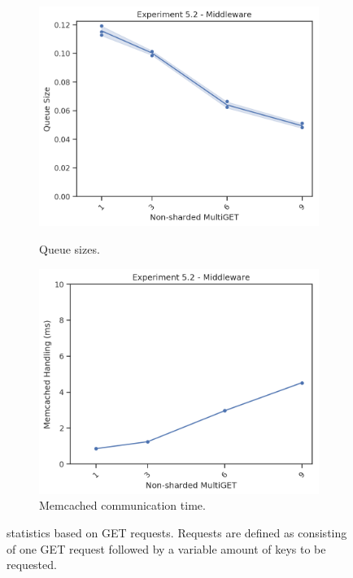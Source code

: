 \begin{figure}
            \begin{subfigure}[t!]{0.48\textwidth}
                \centering
                \includegraphics[width=\textwidth]{../data_analysis/figures/5-2_mw_queue-size.png}
                \caption{Queue sizes.\label{fig:noshard_mw_qs}}
                \includegraphics[width=\textwidth]{../data_analysis/figures/5-2_mw_mc-comm-time.png}
                \caption{Memcached communication time.\label{fig:noshard_mw_mct}}
            \end{subfigure}
            \caption{\mw{} statistics based on GET requests. Requests are defined as consisting of one GET request
                     followed by a variable amount of keys to be requested.\label{fig:noshard_mw}}
        \end{figure}

